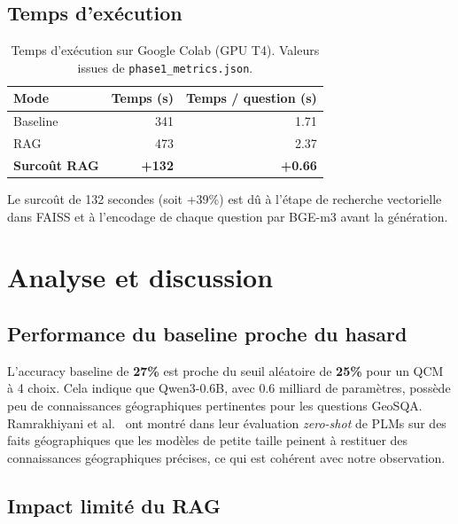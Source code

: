 \documentclass[12pt,a4paper]{article}
\begin{document}
\subsection{Temps d'exécution}

\begin{table}[H]
\centering
\caption{Temps d'exécution sur Google Colab (GPU T4). Valeurs issues de \texttt{phase1\_metrics.json}.}
\label{tab:temps}
\begin{tabular}{@{} l r r @{}}
\toprule
\textbf{Mode} & \textbf{Temps (s)} & \textbf{Temps / question (s)} \\
\midrule
Baseline & 341 & 1.71 \\
RAG & 473 & 2.37 \\
\midrule
\textbf{Surcoût RAG} & \textbf{+132} & \textbf{+0.66} \\
\bottomrule
\end{tabular}
\end{table}

Le surcoût de 132 secondes (soit +39\%) est dû à l'étape de recherche vectorielle dans FAISS et à l'encodage de chaque question par BGE-m3 avant la génération.

\section{Analyse et discussion}
\label{sec:analyse}

\subsection{Performance du baseline proche du hasard}

L'accuracy baseline de \textbf{27\%} est proche du seuil aléatoire de \textbf{25\%} pour un QCM à 4 choix. Cela indique que Qwen3-0.6B, avec 0.6 milliard de paramètres, possède peu de connaissances géographiques pertinentes pour les questions GeoSQA. Ramrakhiyani et al.~\cite{ramrakhiyani_zero-shot_2023} ont montré dans leur évaluation \textit{zero-shot} de PLMs sur des faits géographiques que les modèles de petite taille peinent à restituer des connaissances géographiques précises, ce qui est cohérent avec notre observation.

\subsection{Impact limité du RAG}
\end{document}
